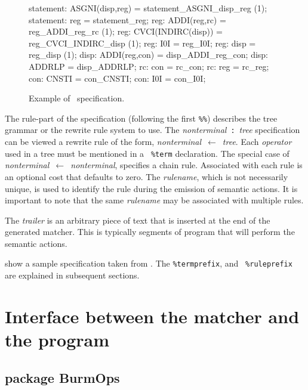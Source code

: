 \begin{figure}
\small
\begin{centercode}
statement:   ASGNI(disp,reg)         = statement_ASGNI_disp_reg   (1);
statement:   reg                     = statement_reg;
reg:    ADDI(reg,rc)            = reg_ADDI_reg_rc       (1);
reg:    CVCI(INDIRC(disp))      = reg_CVCI_INDIRC_disp  (1);
reg:    I0I                     = reg_I0I;
reg:    disp                    = reg_disp              (1);
disp:   ADDI(reg,con)           = disp_ADDI_reg_con;
disp:   ADDRLP                  = disp_ADDRLP;
rc:     con                     = rc_con;
rc:     reg                     = rc_reg;
con:    CNSTI                   = con_CNSTI;
con:    I0I                     = con_I0I;
\end{centercode}
 \caption{Example of \mlburg\ specification.}
 \label{f:ex_spec}
\end{figure}

The rule-part of the specification (following the first {\tt \%\%})
describes the tree grammar or the rewrite rule system to use. The 
\mbox{{\sl nonterminal} {\tt :} {\it tree}} specification can be viewed a
rewrite rule of the form, \mbox{{\sl nonterminal} $\leftarrow$ {\it tree}}.
Each {\sl operator} used in a tree must be mentioned in a {\tt
\%term} declaration. The special case of \mbox{\sl nonterminal
$\leftarrow$ nonterminal}, specifies a chain rule. Associated with
each rule is an optional cost that defaults to zero. The {\sl
rulename}, which is not necessarily unique, is used to identify the
rule during the emission of semantic actions. It is important to note
that the same {\sl rulename} may be associated with multiple rules.

The {\sl trailer} is an arbitrary piece of text that is inserted at
the end of the generated matcher. This is typically segments of
program that will perform the semantic actions.

 show a sample specification taken from
\cite{fraser-hanson-proebsting-92}. The {\tt \%termprefix}, and {\tt
\%ruleprefix} are explained in subsequent sections.


		\section{Interface between the matcher and the program}

	\subsection{package BurmOps}


